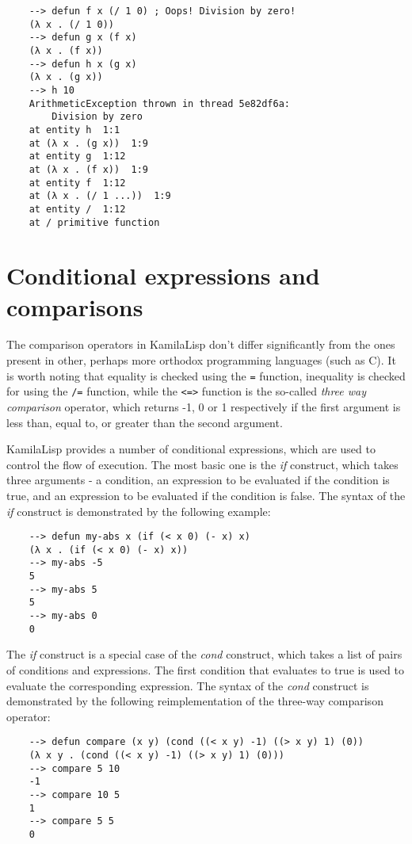 \begin{Verbatim}
    --> defun f x (/ 1 0) ; Oops! Division by zero!
    (λ x . (/ 1 0))
    --> defun g x (f x)
    (λ x . (f x))
    --> defun h x (g x)
    (λ x . (g x))
    --> h 10
    ArithmeticException thrown in thread 5e82df6a:
        Division by zero
    at entity h  1:1
    at (λ x . (g x))  1:9
    at entity g  1:12
    at (λ x . (f x))  1:9
    at entity f  1:12
    at (λ x . (/ 1 ...))  1:9
    at entity /  1:12
    at / primitive function
\end{Verbatim}

\section{Conditional expressions and comparisons}

The comparison operators in KamilaLisp don't differ significantly from the ones present in other, perhaps more orthodox programming languages (such as C). It is worth noting that equality is checked using the \verb|=| function, inequality is checked for using the \verb|/=| function, while the \verb|<=>| function is the so-called \textit{three way comparison} operator, which returns -1, 0 or 1 respectively if the first argument is less than, equal to, or greater than the second argument.

KamilaLisp provides a number of conditional expressions, which are used to control the flow of execution. The most basic one is the \textit{if} construct, which takes three arguments - a condition, an expression to be evaluated if the condition is true, and an expression to be evaluated if the condition is false. The syntax of the \textit{if} construct is demonstrated by the following example:

\begin{Verbatim}
    --> defun my-abs x (if (< x 0) (- x) x)
    (λ x . (if (< x 0) (- x) x))
    --> my-abs -5
    5
    --> my-abs 5
    5
    --> my-abs 0
    0
\end{Verbatim}

The \textit{if} construct is a special case of the \textit{cond} construct, which takes a list of pairs of conditions and expressions. The first condition that evaluates to true is used to evaluate the corresponding expression. The syntax of the \textit{cond} construct is demonstrated by the following reimplementation of the three-way comparison operator:

\begin{Verbatim}
    --> defun compare (x y) (cond ((< x y) -1) ((> x y) 1) (0))
    (λ x y . (cond ((< x y) -1) ((> x y) 1) (0)))
    --> compare 5 10
    -1
    --> compare 10 5
    1
    --> compare 5 5
    0
\end{Verbatim}

